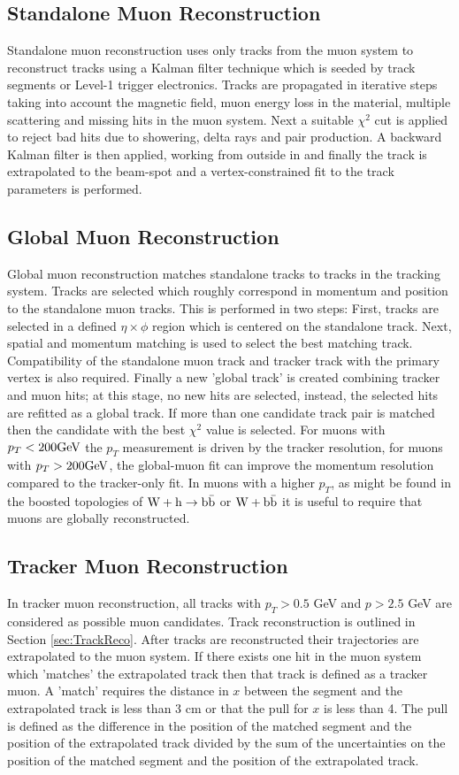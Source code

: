 \subsection{Standalone Muon Reconstruction}
Standalone muon reconstruction uses only tracks from the muon system
to reconstruct tracks using a Kalman filter technique which is seeded
by track segments or Level-1 trigger electronics. Tracks are propagated
in iterative steps taking into account the magnetic field, muon energy loss in the material,
multiple scattering and missing hits in the muon system.
Next a suitable $\chi^{2}$ cut is applied to reject bad hits due to showering,
delta rays and pair production. A backward Kalman filter is then applied,
working from outside in and finally the track is extrapolated to the 
beam-spot and a vertex-constrained fit to the track
parameters is performed.
\subsection{Global Muon Reconstruction}
Global muon reconstruction matches standalone 
tracks to tracks in the tracking system. 
Tracks are selected which roughly correspond in momentum and position to 
the standalone muon tracks. This is performed in two steps: First,
tracks are selected in a defined $\eta\times\phi$ region which is centered
on the standalone track. Next, spatial and momentum matching is 
used to select the best matching track. Compatibility of the 
standalone muon track and tracker track with the 
primary vertex is also required. Finally a new 'global track' is created combining
tracker and muon hits; at this stage, no new hits are selected, instead, 
the selected hits are refitted as a global track. If more than one candidate
track pair is matched then the candidate with the best $\chi^{2}$ value
is selected. 
For muons with $p_{T}<200\mathrm{GeV}$ the $p_{T}$ measurement is driven
by the tracker resolution, for muons with $p_{T}>200\mathrm{GeV}$,
the global-muon fit can improve the momentum resolution compared
to the tracker-only fit.
In muons with a higher $p_{T}$, as might be found
in the boosted topologies of $\mathrm{W+h\rightarrow\mathrm{b\bar{b}}}$ or $\mathrm{W+\mathrm{b\bar{b}}}$ it is useful to require that muons
are globally reconstructed.
\subsection{Tracker Muon Reconstruction}
In tracker muon reconstruction, all tracks with $p_{T}>0.5$ GeV
and $p>2.5$ GeV are considered as possible muon candidates. 
Track reconstruction is outlined in Section \ref{sec:TrackReco}.
After tracks are reconstructed their trajectories are extrapolated to the muon
system. %
If there exists one hit in the muon system which 'matches' the extrapolated track then 
that track is defined as a tracker muon. A 'match' requires
the distance in $x$ between the segment and the extrapolated
track is less than 3 cm or that the pull for $x$ is less than 4. 
The pull is defined as the difference in the position of the matched segment
and the position of the extrapolated track divided by the sum of 
the uncertainties on the position of the matched segment
and the position of the extrapolated track.
